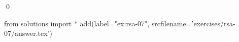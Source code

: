
\begin{ex} 
  \label{ex:rsa-07}
  
  \qed
\end{ex} 
\begin{python0}
from solutions import *
add(label="ex:rsa-07",
    srcfilename='exercises/rsa-07/answer.tex') 
\end{python0}
